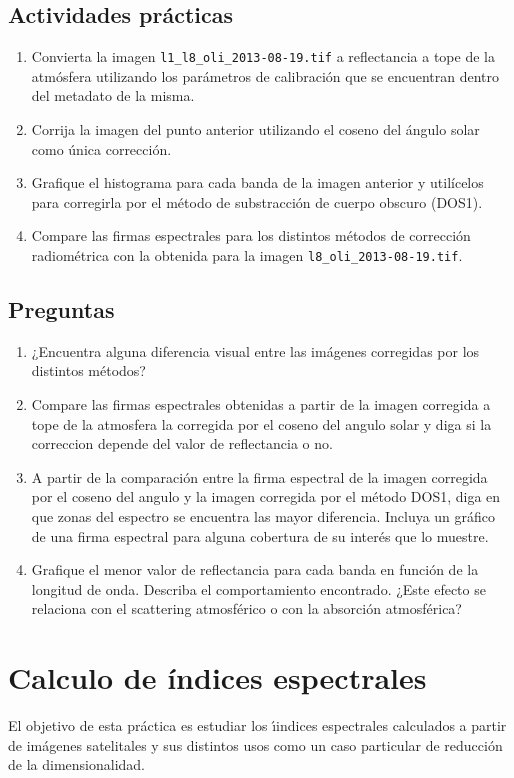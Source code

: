 \documentclass[hidelinks,12pt]{article}
\begin{document}
\subsection{Actividades pr\'acticas}
\begin{enumerate}
    \item Convierta la imagen  \texttt{l1\_l8\_oli\_2013-08-19.tif} a reflectancia a 
        tope de la atmósfera utilizando los parámetros de calibración que se 
        encuentran dentro del metadato de la misma.
    \item Corrija la imagen del punto anterior utilizando el coseno del ángulo solar 
        como única corrección.
    \item Grafique el histograma para cada banda de la imagen anterior y utilícelos 
        para corregirla por el método de substracción de cuerpo obscuro (DOS1).
    \item Compare las firmas espectrales para los distintos métodos de
        corrección radiométrica con la obtenida para la imagen 
        \texttt{l8\_oli\_2013-08-19.tif}.
\end{enumerate}

\subsection{Preguntas}
\begin{enumerate}
    \item ¿Encuentra alguna diferencia visual entre las imágenes corregidas por los
        distintos métodos?
    \item Compare las firmas espectrales obtenidas a partir de la imagen
        corregida a tope de la atmosfera  la corregida por el coseno del angulo
        solar y diga si la correccion depende del valor de reflectancia o no.
    \item A partir de la comparación entre la firma espectral de la imagen
        corregida por el coseno del angulo y la imagen corregida por el método DOS1, 
        diga en que zonas del espectro se encuentra las mayor diferencia. Incluya 
        un gráfico de una firma espectral para alguna cobertura de su interés que 
        lo muestre.
    \item Grafique el menor valor de reflectancia para cada banda en función de la
        longitud de onda. Describa el comportamiento encontrado. ¿Este efecto se
        relaciona con el scattering atmosférico o con la absorción atmosférica?
\end{enumerate}
\newpage
\section{Calculo de \'indices espectrales}
El objetivo de esta práctica es estudiar los \'{\i}indices espectrales
calculados a partir de  imágenes satelitales y sus distintos usos como un caso
particular de reducci\'on de la dimensionalidad.
\end{document}
